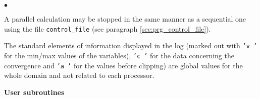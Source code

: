 {{{{\begin{list}{$\bullet$}{}
\item A parallel calculation may be stopped in the same manner as a
      sequential one using the file \texttt{control\_file} (see paragraph
      \ref{sec:prg_control_file}).

\item The standard elements of information displayed in the log
      (marked out with \texttt{'v  '} for the min/max values of the
      variables), \texttt{'c  '} for the data concerning the convergence
      and \texttt{'a  '} for the values before clipping) are global
      values for the whole domain and not related to each processor.

\end{list}

\vspace{0.5cm}
{\bf User subroutines}

}}}}
